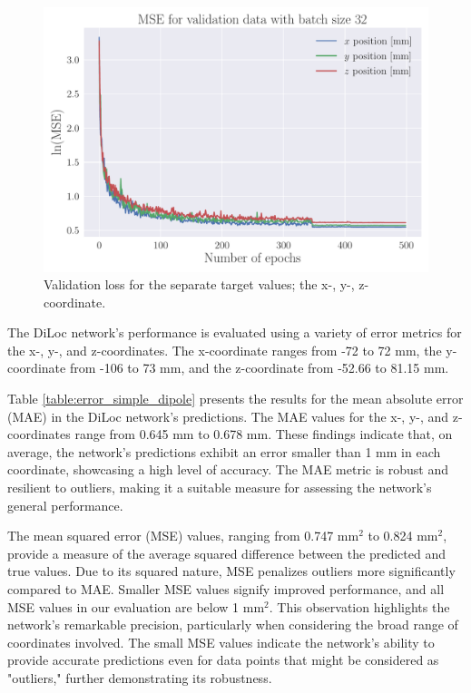 \documentclass[a4paper, UKenglish, 11pt]{uiomaster}
\begin{document}
\begin{figure}[!htb]
    \centering
    \includegraphics[width=\linewidth]{figures/mse_targets_simple_32_0.001_0.35_0.5_0.0_500_(0).pdf}
    \caption{Validation loss for the separate target values; the x-, y-, z-coordinate.}
    \label{fig:single_dipole_accuracy_targets}
\end{figure}



The DiLoc network's performance is evaluated using a variety of error metrics for the x-, y-, and z-coordinates. The x-coordinate ranges from -72 to 72 mm, the y-coordinate from -106 to 73 mm, and the z-coordinate from -52.66 to 81.15 mm.

Table \ref{table:error_simple_dipole} presents the results for the mean absolute error (MAE) in the DiLoc network's predictions. The MAE values for the x-, y-, and z-coordinates range from 0.645 mm to 0.678 mm. These findings indicate that, on average, the network's predictions exhibit an error smaller than 1 mm in each coordinate, showcasing a high level of accuracy. The MAE metric is robust and resilient to outliers, making it a suitable measure for assessing the network's general performance.

The mean squared error (MSE) values, ranging from 0.747 mm$^2$ to 0.824 mm$^2$, provide a measure of the average squared difference between the predicted and true values. Due to its squared nature, MSE penalizes outliers more significantly compared to MAE. Smaller MSE values signify improved performance, and all MSE values in our evaluation are below 1 mm$^2$. This observation highlights the network's remarkable precision, particularly when considering the broad range of coordinates involved. The small MSE values indicate the network's ability to provide accurate predictions even for data points that might be considered as "outliers," further demonstrating its robustness.
\end{document}
